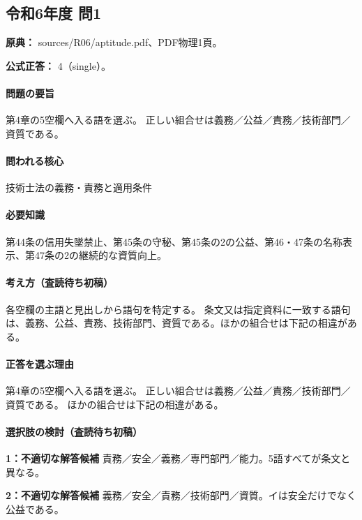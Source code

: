 \subsection{令和6年度 問1}
\label{q:r06-reg-apt-01}

\noindent\textbf{原典：} sources/R06/aptitude.pdf、PDF物理1頁。

\textbf{公式正答：} 4（single）。

\paragraph{問題の要旨} 第4章の5空欄へ入る語を選ぶ。 正しい組合せは義務／公益／責務／技術部門／資質である。

\paragraph{問われる核心} 技術士法の義務・責務と適用条件

\paragraph{必要知識} 第44条の信用失墜禁止、第45条の守秘、第45条の2の公益、第46・47条の名称表示、第47条の2の継続的な資質向上。

\paragraph{考え方（査読待ち初稿）} 各空欄の主語と見出しから語句を特定する。 条文又は指定資料に一致する語句は、義務、公益、責務、技術部門、資質である。ほかの組合せは下記の相違がある。

\paragraph{正答を選ぶ理由} 第4章の5空欄へ入る語を選ぶ。 正しい組合せは義務／公益／責務／技術部門／資質である。 ほかの組合せは下記の相違がある。

\paragraph{選択肢の検討（査読待ち初稿）}\mbox{}\par

\noindent\textbf{1：不適切な解答候補} 責務／安全／義務／専門部門／能力。5語すべてが条文と異なる。\par

\noindent\textbf{2：不適切な解答候補} 義務／安全／責務／技術部門／資質。イは安全だけでなく公益である。\par

